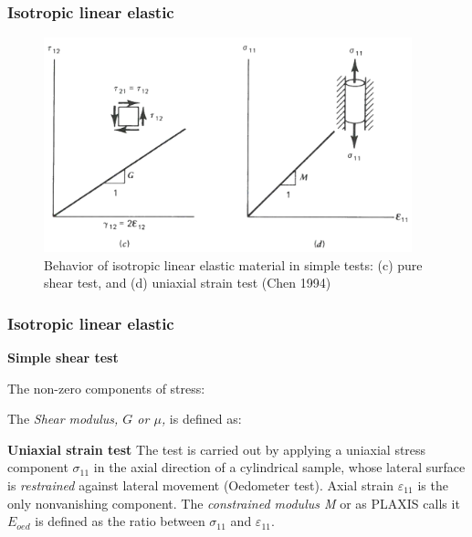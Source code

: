 \documentclass[notes]{beamer}
\begin{document}
\begin{frame}
\frametitle{Isotropic linear elastic}
\begin{figure}
	\includegraphics[width=0.95\textwidth]{figs/isotropic-linear-elastic-1.png}
	\caption*{Behavior of isotropic linear elastic material in simple tests: (c) pure shear test, and (d) uniaxial strain test (Chen 1994)}
\end{figure}
\end{frame}

\begin{frame}
\frametitle{Isotropic linear elastic}
\textbf{Simple shear test}

The non-zero components of stress: 

The \textit{Shear modulus, $G$ or $\mu$,}  is defined as: 

\textbf{Uniaxial strain test}
The test is carried out by applying a uniaxial stress component $\sigma_{11}$ in the axial direction of a cylindrical sample, whose lateral surface is \textit{restrained} against lateral movement (Oedometer test). Axial strain $\varepsilon_{11}$ is the only nonvanishing component. The \textit{constrained modulus M} or as PLAXIS calls it $E_{oed}$ is defined as the ratio between $\sigma_{11}$ and $\varepsilon_11$.

\end{frame}
\end{document}
